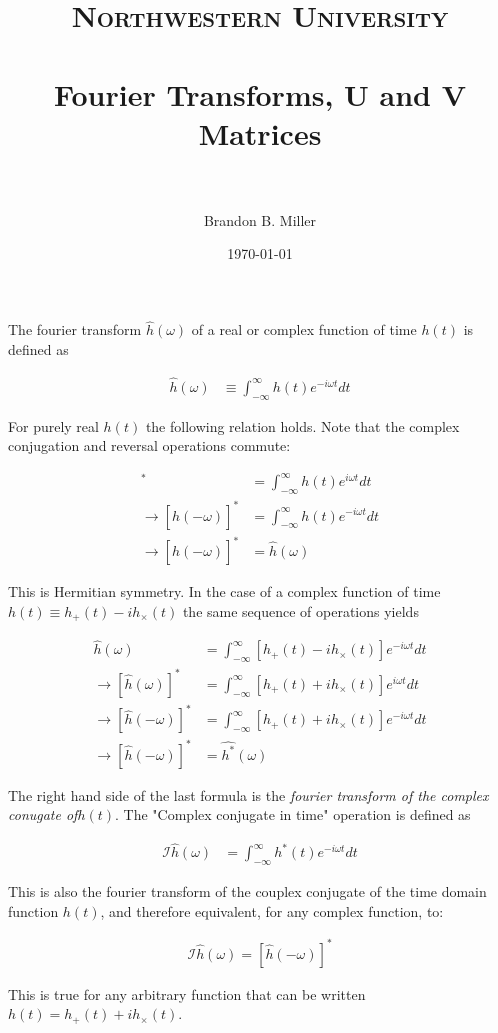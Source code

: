 \documentclass[paper=a4, fontsize=11pt]{scrartcl} %
\title{	
\normalfont \normalsize 
\textsc{Northwestern University} \\ [25pt] %
\horrule{0.5pt} \\[0.4cm] %
\huge Fourier Transforms, U and V Matrices \\ %
\horrule{2pt} \\[0.5cm] %
}
\author{Brandon B. Miller} %
\date{\normalsize\today} %
\numberwithin{equation}{section} %
\numberwithin{figure}{section} %
\numberwithin{table}{section} %
\begin{document}
\maketitle %

The fourier transform $\hat{h}(\omega)$ of a real or complex function of time $h(t)$ is defined as

\begin{align}
\hat{h}(\omega) &\equiv \int_{-\infty}^{\infty} h(t)e^{-i \omega t} dt
\end{align}

For purely real $h(t)$ the following relation holds. Note that the complex conjugation and reversal operations commute:

\begin{align}
[\hat{h}(\omega)]^{*} &= \int_{-\infty}^{\infty}h(t)e^{i \omega t}dt \\
\rightarrow [\hat{h}(-\omega)]^{*} &= \int_{-\infty}^{\infty}h(t)e^{-i \omega t}dt \\
\rightarrow [\hat{h}(-\omega)]^{*} &= \hat{h}(\omega)
\end{align}

This is Hermitian symmetry. In the case of a complex function of time $h(t) \equiv h_{+}(t) - i h_{\times}(t)$ the same sequence of operations yields


\begin{align}
\hat{h}(\omega) &= \int_{-\infty}^{\infty}[h_{+}(t) - i h_{\times}(t)] e^{-i \omega t} dt \\
\rightarrow [\hat{h}(\omega)]^{*} &= \int_{-\infty}^{\infty}[h_{+}(t) + i h_{\times}(t)]e^{i \omega t}dt \\
\rightarrow [\hat{h}(-\omega)]^{*} &= \int_{-\infty}^{\infty}[h_{+}(t) + i h_{\times}(t)]e^{-i \omega t}dt \\
\rightarrow [\hat{h}(-\omega)]^{*} &= \widehat{h^{*}}(\omega)
\end{align}

The right hand side of the last formula is the \textit{fourier transform of the complex conugate of}$h(t)$. The "Complex conjugate in time" operation is defined as 

\begin{align}
\mathcal{I}\hat{h}(\omega) &= \int_{-\infty}^{\infty}h^{*}(t)e^{-i \omega t}dt 
\end{align}

This is also the fourier transform of the couplex conjugate of the time domain function $h(t)$, and therefore equivalent, for any complex function, to:

\begin{align}
\mathcal{I}\hat{h}(\omega) = [\hat{h}(-\omega)]^{*}
\end{align}

This is true for any arbitrary function that can be written $h(t) = h_{+}(t) + i h_{\times}(t)$. 
\end{document}
